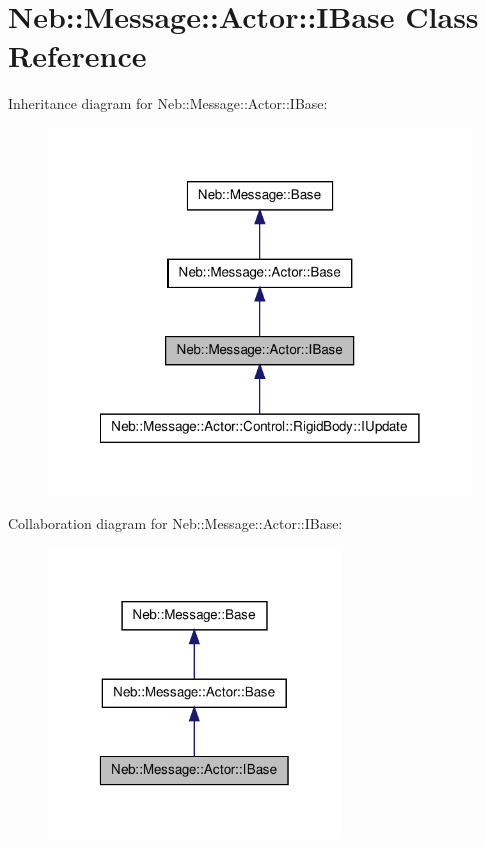 \hypertarget{classNeb_1_1Message_1_1Actor_1_1IBase}{\section{\-Neb\-:\-:\-Message\-:\-:\-Actor\-:\-:\-I\-Base \-Class \-Reference}
\label{classNeb_1_1Message_1_1Actor_1_1IBase}
}


\-Inheritance diagram for \-Neb\-:\-:\-Message\-:\-:\-Actor\-:\-:\-I\-Base\-:\nopagebreak
\begin{figure}[H]
\begin{center}
\leavevmode
\includegraphics[width=318pt]{classNeb_1_1Message_1_1Actor_1_1IBase__inherit__graph}
\end{center}
\end{figure}


\-Collaboration diagram for \-Neb\-:\-:\-Message\-:\-:\-Actor\-:\-:\-I\-Base\-:\nopagebreak
\begin{figure}[H]
\begin{center}
\leavevmode
\includegraphics[width=220pt]{classNeb_1_1Message_1_1Actor_1_1IBase__coll__graph}
\end{center}
\end{figure}
